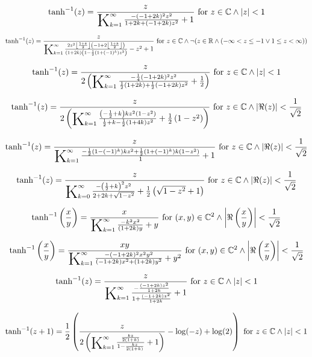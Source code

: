 \documentclass{article}
\newcommand{\bigK}{\mathop{\raisebox{-5pt}{\huge K}}}
\begin{document}
\[\tanh ^{-1}(z)=\frac{z}{\bigK_{k=1}^{\infty}\frac{-(-1+2 k)^2 z^2}{1+2 k+(-1+2 k) z^2}+1}\text{ for }z\in \mathbb{C}\land \left| z\right| <1\] 

\[\tanh ^{-1}(z)=\frac{z}{\bigK_{k=1}^{\infty}\frac{2 z^2 \left\lfloor \frac{1+k}{2}\right\rfloor  \left(-1+2 \left\lfloor \frac{1+k}{2}\right\rfloor \right)}{(1+2 k) \left(1-\frac{1}{2} \left(1+(-1)^k\right) z^2\right)}-z^2+1}\text{ for }z\in \mathbb{C}\land \neg (z\in \mathbb{R}\land (-\infty <z\leq -1\lor 1\leq z<\infty ))\] 

\[\tanh ^{-1}(z)=\frac{z}{2 \left(\bigK_{k=1}^{\infty}\frac{-\frac{1}{4} (-1+2 k)^2 z^2}{\frac{1}{2} (1+2 k)+\frac{1}{2} (-1+2 k) z^2}+\frac{1}{2}\right)}\text{ for }z\in \mathbb{C}\land \left| z\right| <1\] 

\[\tanh ^{-1}(z)=\frac{z}{2 \left(\bigK_{k=1}^{\infty}\frac{\left(-\frac{1}{2}+k\right) k z^2 \left(1-z^2\right)}{\frac{1}{2}+k-\frac{1}{2} (1+4 k) z^2}+\frac{1}{2} \left(1-z^2\right)\right)}\text{ for }z\in \mathbb{C}\land \left| \Re(z)\right| <\frac{1}{\sqrt{2}}\] 

\[\tanh ^{-1}(z)=\frac{z}{\bigK_{k=1}^{\infty}\frac{-\frac{1}{2} \left(1-(-1)^k\right) k z^2+\frac{1}{2} \left(1+(-1)^k\right) k \left(1-z^2\right)}{1}+1}\text{ for }z\in \mathbb{C}\land \left| \Re(z)\right| <\frac{1}{\sqrt{2}}\] 

\[\tanh ^{-1}(z)=\frac{z}{\bigK_{k=0}^{\infty}\frac{-\left(\frac{1}{2}+k\right)^2 z^2}{2+2 k+\sqrt{1-z^2}}+\frac{1}{2} \left(\sqrt{1-z^2}+1\right)}\text{ for }z\in \mathbb{C}\land \left| \Re(z)\right| <\frac{1}{\sqrt{2}}\] 

\[\tanh ^{-1}\left(\frac{x}{y}\right)=\frac{x}{\bigK_{k=1}^{\infty}\frac{-k^2 x^2}{(1+2 k) y}+y}\text{ for }(x,y)\in \mathbb{C}^2\land \left| \Re\left(\frac{x}{y}\right)\right| <\frac{1}{\sqrt{2}}\] 

\[\tanh ^{-1}\left(\frac{x}{y}\right)=\frac{x y}{\bigK_{k=1}^{\infty}\frac{-(-1+2 k)^2 x^2 y^2}{(-1+2 k) x^2+(1+2 k) y^2}+y^2}\text{ for }(x,y)\in \mathbb{C}^2\land \left| \Re\left(\frac{x}{y}\right)\right| <\frac{1}{\sqrt{2}}\] 

\[\tanh ^{-1}(z)=\frac{z}{\bigK_{k=1}^{\infty}\frac{-\frac{(-1+2 k) z^2}{1+2 k}}{1+\frac{(-1+2 k) z^2}{1+2 k}}+1}\text{ for }z\in \mathbb{C}\land \left| z\right| <1\] 

\[\tanh ^{-1}(z+1)=\frac{1}{2} \left(\frac{z}{2 \left(\bigK_{k=1}^{\infty}\frac{\frac{k z}{2 (1+k)}}{1-\frac{k z}{2 (1+k)}}+1\right)}-\log (-z)+\log (2)\right)\text{ for }z\in \mathbb{C}\land \left| z\right| <1\] 
\end{document}
